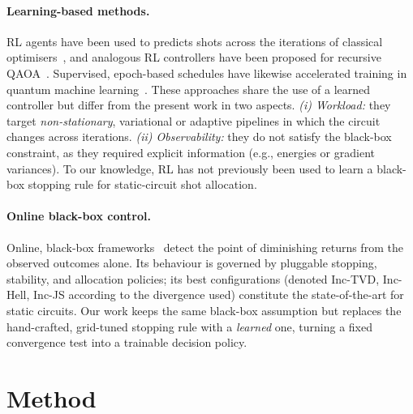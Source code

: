 \documentclass[runningheads]{llncs}
\begin{document}
\paragraph{Learning-based methods.} 
RL agents have been used to predicts shots across the iterations of classical optimisers~\cite{liang2024shotreduction}, and analogous RL controllers have been
proposed for recursive QAOA~\cite{rqaoa2026rlshots}. Supervised, epoch-based
schedules have likewise accelerated training in quantum machine
learning~\cite{phalak2023shot}. These approaches share the use of a learned
controller but differ from the present work in two aspects. \emph{(i) Workload:} they target \emph{non-stationary}, variational or
adaptive pipelines in which the circuit changes across iterations.
\emph{(ii) Observability:} they do not satisfy the black-box constraint, as they required explicit information (e.g., energies or gradient variances).
To our
knowledge, RL has not previously been used to learn a black-box stopping rule
for static-circuit shot allocation.

\paragraph{Online black-box control.} Online,
black-box frameworks~\cite{bisicchia2026shots,chen2024shotqc}  detect the point of
diminishing returns from the observed outcomes alone. Its behaviour is governed
by pluggable stopping, stability, and allocation policies; its best
configurations (denoted \mbox{Inc-TVD}, \mbox{Inc-Hell}, \mbox{Inc-JS}
according to the divergence used) constitute the state-of-the-art for static
circuits. Our work keeps the same black-box assumption but replaces the
hand-crafted, grid-tuned stopping rule with a \emph{learned} one, turning a
fixed convergence test into a trainable decision policy.

\section{Method}
\label{sec:method}
\end{document}
